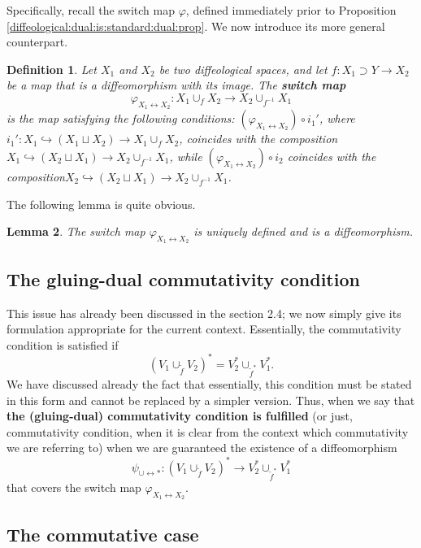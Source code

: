 \documentclass{article}
\newtheorem{lemma}{Lemma}[section]
\newtheorem{defn}[lemma]{Definition}
\begin{document}
Specifically, recall the switch map $\varphi$, defined immediately prior to Proposition \ref{diffeological:dual:is:standard:dual:prop}. We now introduce its more general counterpart.

\begin{defn}
Let $X_1$ and $X_2$ be two diffeological spaces, and let $f:X_1\supset Y\to X_2$ be a map that is a diffeomorphism with its image. The \textbf{switch map} 
$$\varphi_{X_1\leftrightarrow X_2}:X_1\cup_f X_2\to X_2\cup_{f^{-1}}X_1$$ is the map satisfying the following conditions: $(\varphi_{X_1\leftrightarrow X_2})\circ i_1'$, where $i_1':X_1\hookrightarrow(X_1\sqcup X_2)\to X_1\cup_f X_2$, coincides with the composition $X_1\hookrightarrow(X_2\sqcup X_1)\to X_2\cup_{f^{-1}}X_1$, while $(\varphi_{X_1\leftrightarrow X_2})\circ i_2$ 
coincides with the composition$X_2\hookrightarrow(X_2\sqcup X_1)\to X_2\cup_{f^{-1}}X_1$.
\end{defn}

The following lemma is quite obvious.

\begin{lemma}
The switch map $\varphi_{X_1\leftrightarrow X_2}$ is uniquely defined and is a diffeomorphism.
\end{lemma}


\subsection{The gluing-dual commutativity condition}

This issue has already been discussed in the section 2.4; we now simply give its formulation appropriate for the current context. Essentially, the commutativity condition is satisfied if
$$(V_1\cup_{\tilde{f}}V_2)^*=V_2^*\cup_{\tilde{f}^*}V_1^*.$$ We have discussed already the fact that essentially, this condition must be stated in this form and cannot be replaced by a simpler version. Thus, 
when we say that \textbf{the (gluing-dual) commutativity condition is fulfilled} (or just, commutativity condition, when it is clear from the context which commutativity we are referring to) when we are guaranteed 
the existence of a diffeomorphism
$$\psi_{\cup\leftrightarrow *}:(V_1\cup_{\tilde{f}}V_2)^*\to V_2^*\cup_{\tilde{f}^*}V_1^*$$ that covers the switch map $\varphi_{X_1\leftrightarrow X_2}$.


\subsection{The commutative case}
\end{document}
